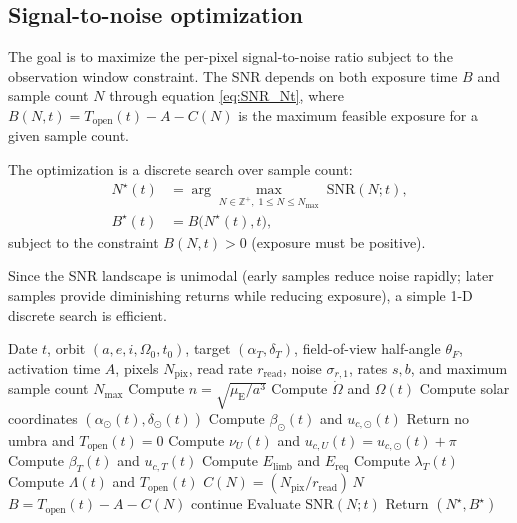 \documentclass[preprint,12pt]{elsarticle}
\newcommand{\Rearth}{R_{\mathrm{E}}}
\newcommand{\muearth}{\mu_{\mathrm{E}}}
\theoremstyle{definition}
\theoremstyle{remark}
\begin{document}
\subsection{Signal-to-noise optimization}

The goal is to maximize the per-pixel signal-to-noise ratio subject to the observation window constraint.
The SNR depends on both exposure time $B$ and sample count $N$ through equation \eqref{eq:SNR_Nt},
where $B(N,t)=T_{\mathrm{open}}(t)-A-C(N)$ is the maximum feasible exposure for a given sample count.

The optimization is a discrete search over sample count:
\begin{align}
N^\star(t) &= \arg\max_{N\in\mathbb{Z}^+,\;1\le N\le N_{\max}}\; \mathrm{SNR}(N;t),\\
B^\star(t) &= B\big(N^\star(t),t\big),
\label{eq:optimization}
\end{align}
subject to the constraint $B(N,t)>0$ (exposure must be positive).

Since the SNR landscape is unimodal (early samples reduce noise rapidly; later samples provide diminishing returns while reducing exposure), a simple 1-D discrete search is efficient.

\begin{algorithm}[t]
\caption{Date-driven operations optimizer}
\label{alg:optimizer}
\begin{algorithmic}[1]
\Require Date $t$, orbit $(a,e,i,\Omega_0,t_0)$, target $(\alpha_T,\delta_T)$, field-of-view half-angle $\theta_F$, activation time $A$, pixels $N_{\mathrm{pix}}$, read rate $r_{\mathrm{read}}$, noise $\sigma_{r,1}$, rates $s,b$, and maximum sample count $N_{\max}$
\State Compute $n=\sqrt{\muearth/a^3}$
\State Compute $\dot{\Omega}$ and $\Omega(t)$
\State Compute solar coordinates $(\alpha_\odot(t),\delta_\odot(t))$
\State Compute $\beta_\odot(t)$ and $u_{c,\odot}(t)$
\If{$|\beta_\odot(t)| \ge \sin^{-1}(\Rearth/a)$}
    \State Return no umbra and $T_{\mathrm{open}}(t)=0$
\EndIf
\State Compute $\nu_U(t)$ and $u_{c,U}(t)=u_{c,\odot}(t)+\pi$
\State Compute $\beta_T(t)$ and $u_{c,T}(t)$
\State Compute $E_{\mathrm{limb}}$ and $E_{\mathrm{req}}$
\State Compute $\lambda_T(t)$
\State Compute $\Lambda(t)$ and $T_{\mathrm{open}}(t)$
    \State $C(N)=(N_{\mathrm{pix}}/r_{\mathrm{read}})\,N$
    \State $B=T_{\mathrm{open}}(t)-A-C(N)$
        \State continue
    \EndIf
    \State Evaluate $\mathrm{SNR}(N;t)$
\EndFor
\State Return $(N^\star,B^\star)$
\end{algorithmic}
\end{algorithm}
\end{document}
